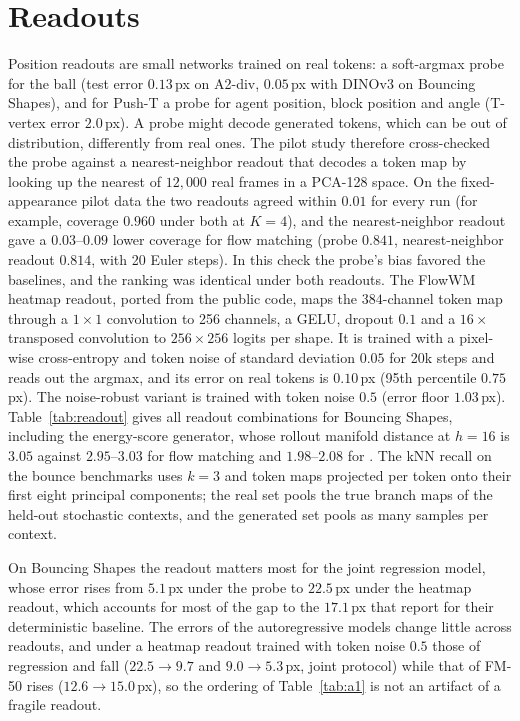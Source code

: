\section{Readouts}
\label{app:readout}
Position readouts are small networks trained on real tokens: a soft-argmax probe for the ball (test error $0.13$\,px on A2-div, $0.05$\,px with DINOv3 on Bouncing Shapes), and for Push-T a probe for agent position, block position and angle (T-vertex error $2.0$\,px). A probe might decode generated tokens, which can be out of distribution, differently from real ones. The pilot study therefore cross-checked the probe against a nearest-neighbor readout that decodes a token map by looking up the nearest of $12{,}000$ real frames in a PCA-128 space. On the fixed-appearance pilot data the two readouts agreed within $0.01$ for every \imlewm{} run (for example, coverage $0.960$ under both at $K{=}4$), and the nearest-neighbor readout gave a $0.03$--$0.09$ lower coverage for flow matching (probe $0.841$, nearest-neighbor readout $0.814$, with 20 Euler steps). In this check the probe's bias favored the baselines, and the ranking was identical under both readouts. The FlowWM heatmap readout, ported from the public code, maps the $384$-channel token map through a $1\times1$ convolution to 256 channels, a GELU, dropout $0.1$ and a $16\times$ transposed convolution to $256\times256$ logits per shape. It is trained with a pixel-wise cross-entropy and token noise of standard deviation $0.05$ for 20k steps and reads out the argmax, and its error on real tokens is $0.10$\,px (95th percentile $0.75$\,px). The noise-robust variant is trained with token noise $0.5$ (error floor $1.03$\,px). Table~\ref{tab:readout} gives all readout combinations for Bouncing Shapes, including the energy-score generator, whose rollout manifold distance at $h{=}16$ is $3.05$ against $2.95$--$3.03$ for flow matching and $1.98$--$2.08$ for \imlewm{}. The kNN recall on the bounce benchmarks uses $k{=}3$ and token maps projected per token onto their first eight principal components; the real set pools the true branch maps of the held-out stochastic contexts, and the generated set pools as many samples per context.

On Bouncing Shapes the readout matters most for the joint regression model, whose error rises from $5.1$\,px under the probe to $22.5$\,px under the heatmap readout, which accounts for most of the gap to the $17.1$\,px that \citet{porcher2026flowwm} report for their deterministic baseline. The errors of the autoregressive models change little across readouts, and under a heatmap readout trained with token noise $0.5$ those of regression and \imlewm{} fall ($22.5 \to 9.7$ and $9.0 \to 5.3$\,px, joint protocol) while that of FM-50 rises ($12.6 \to 15.0$\,px), so the ordering of Table~\ref{tab:a1} is not an artifact of a fragile readout.

